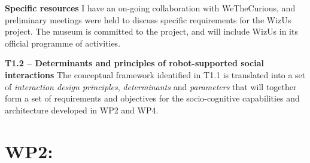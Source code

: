 \documentclass[11pt,a4paper]{report}
\newcommand{\project}{WizUs\xspace}
\begin{document}
\textbf{Specific resources} I have an on-going collaboration with WeTheCurious,
and preliminary meetings were held to discuss specific requirements for the
\project project. The museum is committed to the project, and will include
\project in its official programme of activities.

% 
% 
% 
% 
% 
% 
% 
% 
% 



\textbf{T1.2 -- Determinants and principles of robot-supported social
interactions} The conceptual framework identified in T1.1 is translated
into a set of \emph{interaction design principles}, \emph{determinants} and
\emph{parameters} that will together form a set of requirements and objectives
for the socio-cognitive capabilities and architecture developed in WP2 and WP4.

\section{WP2: \textbf{\wpTwo}}
\end{document}
